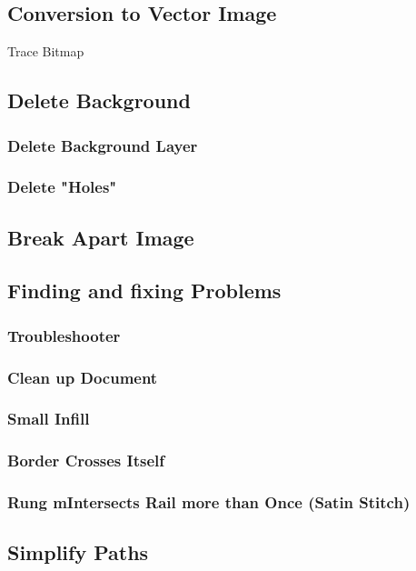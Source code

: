\documentclass{article}
\begin{document}
        \subsection{Conversion to Vector Image} \label{vectorConversion}
        Trace Bitmap    

        \subsection{Delete Background}
        \subsubsection{Delete Background Layer}
        \subsubsection{Delete "Holes"}        
        
        \subsection{Break Apart Image}

        \subsection{Finding and fixing Problems}
            \subsubsection{Troubleshooter}
            \subsubsection{Clean up Document}
            \subsubsection{Small Infill}
            \subsubsection{Border Crosses Itself}
            \subsubsection{Rung mIntersects Rail more than Once (Satin Stitch)}

        \subsection{Simplify Paths}
        
\end{document}
